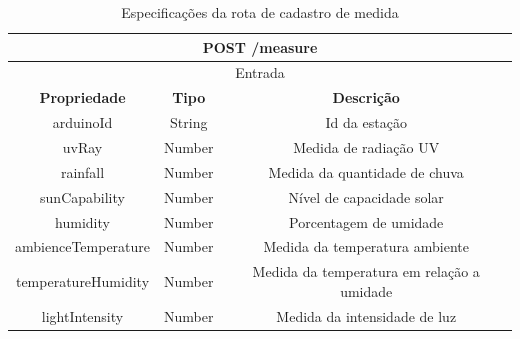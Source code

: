\begin{table}[H]
    \centering
    \caption{Especificações da rota de cadastro de medida}
    \begin{tabular}{c|c|c}
    \hline
    \multicolumn{3}{c}{\textbf{POST /measure}} \\ \hline
    \multicolumn{3}{c}{Entrada}                                                        \\ \hline
    \textbf{Propriedade}         & \textbf{Tipo}         & \textbf{Descrição}            \\  \hline
    arduinoId                         & String                & Id da estação               \\  \hline
    uvRay                        & Number                & Medida de radiação UV \\
    \hline
    rainfall                     & Number                & Medida da quantidade de chuva \\ \hline
    sunCapability                     & Number                & Nível de capacidade solar \\ \hline
    humidity                     & Number                & Porcentagem de umidade \\ \hline
    ambienceTemperature                     & Number                & Medida da temperatura ambiente \\ \hline
    temperatureHumidity                     & Number                & Medida da temperatura em relação a umidade \\ \hline
    lightIntensity                     & Number                & Medida da intensidade de luz \\ \hline
    \hline
    \end{tabular}
\end{table}

